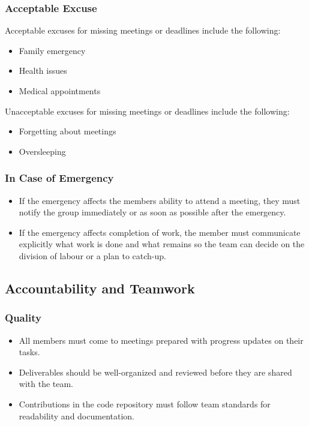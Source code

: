 \documentclass{article}
\begin{document}
\subsubsection*{Acceptable Excuse}
Acceptable excuses for missing meetings or deadlines include the following:
\begin{itemize}
    \item Family emergency
    \item Health issues
    \item Medical appointments
\end{itemize}
Unacceptable excuses for missing meetings or deadlines include the following:
\begin{itemize}
    \item Forgetting about meetings
    \item Oversleeping
\end{itemize}

\subsubsection*{In Case of Emergency}
\begin{itemize}
    \item If the emergency affects the members ability to attend a meeting, they must notify the group immediately or as soon as possible after the emergency.
    \item If the emergency affects completion of work, the member must communicate explicitly what work is done and what remains so the team can decide on the division of labour or a plan to catch-up.
\end{itemize}


\subsection*{Accountability and Teamwork}

\subsubsection*{Quality} 
\begin{itemize}
    \item All members must come to meetings prepared with progress updates on their tasks.
    \item Deliverables should be well-organized and reviewed before they are shared with the team.
    \item Contributions in the code repository must follow team standards for readability and documentation.
\end{itemize}
\end{document}
